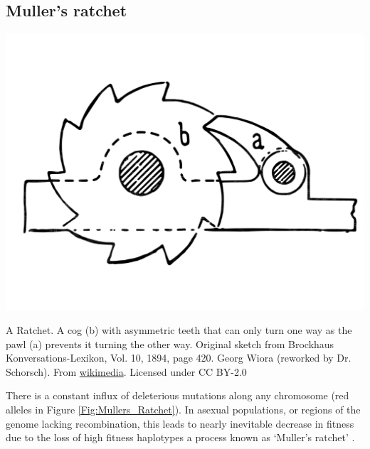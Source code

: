 \subsection{Muller's ratchet}

\begin{marginfigure}[-3cm]
\begin{center}
  \includegraphics[width = 0.75 \textwidth]{illustration_images/multiple_sel_loci/ratchet/1200px-Sperrklinke_Schema.pdf}
\end{center}
\caption{A Ratchet. A cog (b)  with asymmetric teeth that can only turn one way as the pawl (a) prevents it turning the other way. \newline \noindent \tiny{Original sketch from Brockhaus Konversations-Lexikon, Vol. 10, 1894, page 420. Georg Wiora (reworked by Dr. Schorsch). From \href{https://commons.wikimedia.org/wiki/File:Sperrklinke\_Schema.jp2}{wikimedia}. Licensed under CC
    BY-2.0 } } \label{Fig:Ratchet}  
\end{marginfigure}
There is a constant influx of deleterious mutations along any chromosome (red alleles in Figure \ref{Fig:Mullers_Ratchet}). In asexual populations, or regions of the genome lacking recombination, this leads to nearly inevitable decrease in fitness due to the loss of high fitness haplotypes a process known as `Muller's ratchet' \citep{muller1964relation}.

